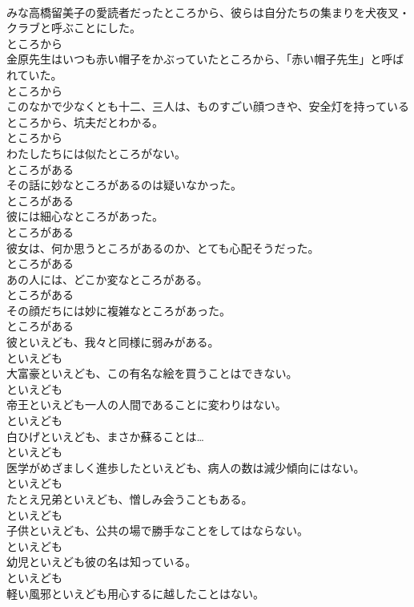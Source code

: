 \documentclass[8pt]{extreport}
\begin{document}
\begin{CJK}{UTF8}{min}
\\	みな高橋留美子の愛読者だったところから、彼らは自分たちの集まりを犬夜叉・クラブと呼ぶことにした。	
\\	ところから
\\	金原先生はいつも赤い帽子をかぶっていたところから、「赤い帽子先生」と呼ばれていた。	
\\	ところから
\\	このなかで少なくとも十二、三人は、ものすごい顔つきや、安全灯を持っているところから、坑夫だとわかる。	
\\	ところから
\\	わたしたちには似たところがない。	
\\	ところがある
\\	その話に妙なところがあるのは疑いなかった。	
\\	ところがある
\\	彼には細心なところがあった。	
\\	ところがある
\\	彼女は、何か思うところがあるのか、とても心配そうだった。	
\\	ところがある
\\	あの人には、どこか変なところがある。	
\\	ところがある
\\	その顔だちには妙に複雑なところがあった。	
\\	ところがある
\\	彼といえども、我々と同様に弱みがある。	
\\	といえども
\\	大富豪といえども、この有名な絵を買うことはできない。	
\\	といえども
\\	帝王といえども一人の人間であることに変わりはない。	
\\	といえども
\\	白ひげといえども、まさか蘇ることは…	
\\	といえども
\\	医学がめざましく進歩したといえども、病人の数は減少傾向にはない。	
\\	といえども
\\	たとえ兄弟といえども、憎しみ会うこともある。	
\\	といえども
\\	子供といえども、公共の場で勝手なことをしてはならない。	
\\	といえども
\\	幼児といえども彼の名は知っている。	
\\	といえども
\\	軽い風邪といえども用心するに越したことはない。	

\end{CJK}
\end{document}
